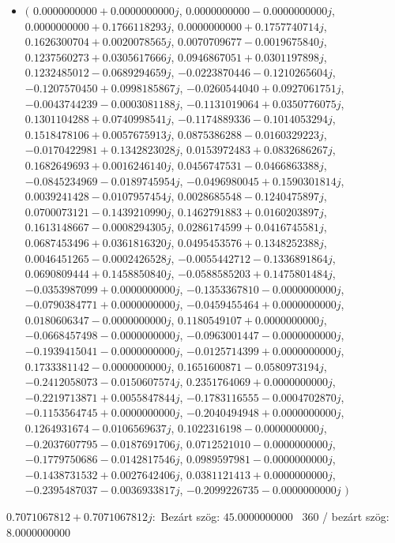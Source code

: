 \documentclass[14pt,a4paper]{article}
\begin{document}
\begin{itemize}
\item
$\big($
$0.0000000000+0.0000000000j$, $0.0000000000-0.0000000000j$, $0.0000000000+0.1766118293j$, $0.0000000000+0.1757740714j$, $0.1626300704+0.0020078565j$, $0.0070709677-0.0019675840j$, $0.1237560273+0.0305617666j$, $0.0946867051+0.0301197898j$, $0.1232485012-0.0689294659j$, $-0.0223870446-0.1210265604j$, $-0.1207570450+0.0998185867j$, $-0.0260544040+0.0927061751j$, $-0.0043744239-0.0003081188j$, $-0.1131019064+0.0350776075j$, $0.1301104288+0.0740998541j$, $-0.1174889336-0.1014053294j$, $0.1518478106+0.0057675913j$, $0.0875386288-0.0160329223j$, $-0.0170422981+0.1342823028j$, $0.0153972483+0.0832686267j$, $0.1682649693+0.0016246140j$, $0.0456747531-0.0466863388j$, $-0.0845234969-0.0189745954j$, $-0.0496980045+0.1590301814j$, $0.0039241428-0.0107957454j$, $0.0028685548-0.1240475897j$, $0.0700073121-0.1439210990j$, $0.1462791883+0.0160203897j$, $0.1613148667-0.0008294305j$, $0.0286174599+0.0416745581j$, $0.0687453496+0.0361816320j$, $0.0495453576+0.1348252388j$, $0.0046451265-0.0002426528j$, $-0.0055442712-0.1336891864j$, $0.0690809444+0.1458850840j$, $-0.0588585203+0.1475801484j$, $-0.0353987099+0.0000000000j$, $-0.1353367810-0.0000000000j$, $-0.0790384771+0.0000000000j$, $-0.0459455464+0.0000000000j$, $0.0180606347-0.0000000000j$, $0.1180549107+0.0000000000j$, $-0.0668457498-0.0000000000j$, $-0.0963001447-0.0000000000j$, $-0.1939415041-0.0000000000j$, $-0.0125714399+0.0000000000j$, $0.1733381142-0.0000000000j$, $0.1651600871-0.0580973194j$, $-0.2412058073-0.0150607574j$, $0.2351764069+0.0000000000j$, $-0.2219713871+0.0055847844j$, $-0.1783116555-0.0004702870j$, $-0.1153564745+0.0000000000j$, $-0.2040494948+0.0000000000j$, $0.1264931674-0.0106569637j$, $0.1022316198-0.0000000000j$, $-0.2037607795-0.0187691706j$, $0.0712521010-0.0000000000j$, $-0.1779750686-0.0142817546j$, $0.0989597981-0.0000000000j$, $-0.1438731532+0.0027642406j$, $0.0381121413+0.0000000000j$, $-0.2395487037-0.0036933817j$, $-0.2099226735-0.0000000000j$
$\big)$
\end{itemize}
$0.7071067812+0.7071067812j$:\
Bezárt szög: $45.0000000000$ \
360 / bezárt szög: $8.0000000000$\
\end{document}
